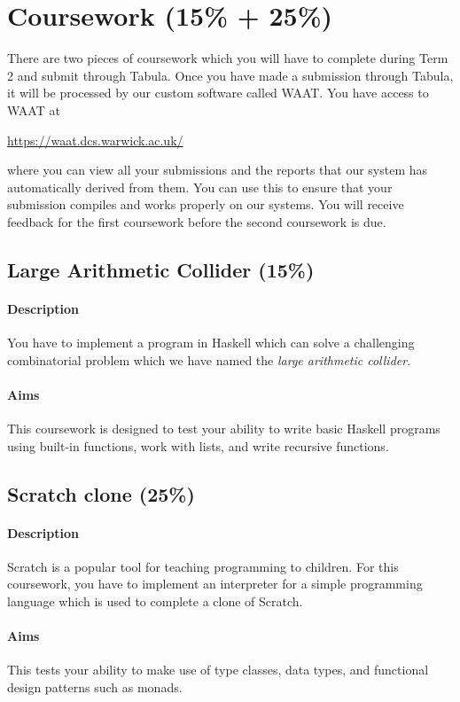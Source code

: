 \pagebreak
\section{Coursework (15\% + 25\%)}

There are two pieces of coursework which you will have to complete during Term 2 and submit through Tabula. Once you have made a submission through Tabula, it will be processed by our custom software called WAAT. You have access to WAAT at
\begin{center}
	\url{https://waat.dcs.warwick.ac.uk/}
\end{center}
where you can view all your submissions and the reports that our system has automatically derived from them. You can use this to ensure that your submission compiles and works properly on our systems. You will receive feedback for the first coursework before the second coursework is due.

\subsection{Large Arithmetic Collider (15\%)}

\paragraph{Description} You have to implement a program in Haskell which can solve a challenging combinatorial problem which we have named the \emph{large arithmetic collider}. 

\paragraph{Aims} This coursework is designed to test your ability to write basic Haskell programs using built-in functions, work with lists, and write recursive functions. 

\subsection{Scratch clone (25\%)}

\paragraph{Description} Scratch is a popular tool for teaching programming to children. For this coursework, you have to implement an interpreter for a simple programming language which is used to complete a clone of Scratch. 

\paragraph{Aims} This tests your ability to make use of type classes, data types, and functional design patterns such as monads.